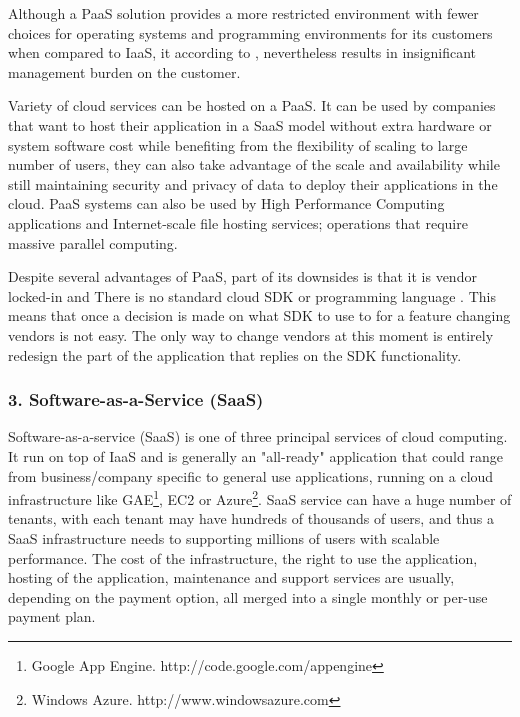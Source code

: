 Although a PaaS solution provides a more restricted environment with fewer choices for operating systems and programming environments for its customers when compared to IaaS, it according to \cite{SITARAM201273}, nevertheless results in insignificant management burden on the customer.

Variety of cloud services can be hosted on a PaaS. It can be used by companies that want to host their application in a SaaS model without extra hardware or system software cost while benefiting from the flexibility of scaling to large number of users, they can also take advantage of the scale and availability while still maintaining security and privacy of data to deploy their applications in the cloud. PaaS systems can also be used by High Performance Computing applications and Internet-scale file hosting services; operations that require massive parallel computing.

Despite several advantages of PaaS, part of its downsides is that it is vendor locked-in and There is no standard cloud SDK or programming language \cite{teixeira2014building}. This means that once a decision is made on what SDK to use to for a feature changing vendors is not easy. The only way to change vendors at this moment is entirely redesign the part of the application that replies on the SDK functionality.

\subsubsection{3. Software-as-a-Service (SaaS)}
Software-as-a-service (SaaS) is one of three principal services of cloud computing. It run on top of IaaS and is generally an "all-ready" application that could range from business/company specific to general use applications, running on a cloud infrastructure like GAE\footnote{Google App Engine. http://code.google.com/appengine}, EC2 or Azure\footnote{Windows Azure. http://www.windowsazure.com}. SaaS service can have a huge number of tenants, with each tenant may have hundreds of thousands of users, and thus a SaaS infrastructure needs to supporting millions of users with scalable performance. The cost of the infrastructure, the right to use the application, hosting of the application, maintenance and support services are usually, depending on the payment option, all merged into a single monthly or per-use payment plan.

